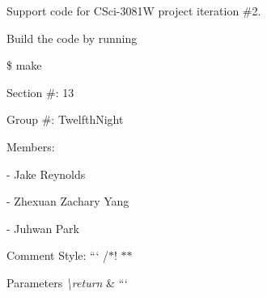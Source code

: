 Support code for C\-Sci-\/3081\-W project iteration \#2.

Build the code by running

{\ttfamily \$ make}

Section \#\-: 13

Group \#\-: Twelfth\-Night

Members\-: \begin{DoxyVerb}  - Jake Reynolds 

  - Zhexuan Zachary Yang

  - Juhwan Park
\end{DoxyVerb}


Comment Style\-: ``` /$\ast$! $\ast$$\ast$ 
\begin{DoxyParams}{Parameters}
{\em \textbackslash{}return} & ``` \\
\hline
\end{DoxyParams}
